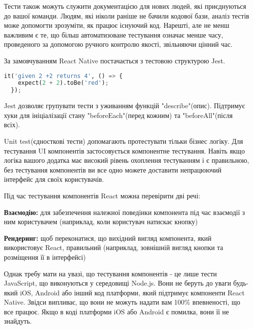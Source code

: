 Тести також можуть служити документацією для нових людей, які приєднуються до вашої команди.
Людям, які ніколи раніше не бачили кодової бази, аналіз тестів може допомогти зрозуміти, як працює існуючий код.
Нарешті, але не менш важливим є те, що більш автоматизоване тестування означає менше часу, проведеного за допомогою ручного контролю якості, звільняючи цінний час.

За замовчуванням React Native постачається з тестовою структурою Jest. \cite{jest_home_page}

\begin{lstlisting}[style=light, language=Python,label={lst:rn_jest_test},caption=Jest Unit Test]
  it('given 2 +2 returns 4', () => {
    expect(2 + 2).toBe('red');
  });
\end{lstlisting}

Jest дозволяє групувати тести з уживанням функцій "describe"(опис).
Підтримує хуки для ініціалізації стану "beforeEach"(перед кожним) та "beforeAll"(після всіх).

Unit test(єдносткові тести) допомагають протестувати тільки бізнес логіку.
Для тестування UI компонентів застосовується компонентне тестування.
Навіть якщо логіка вашого додатка має високий рівень охоплення тестуванням і є правильною,
без тестування компонентів ви все одно можете доставити непрацюючий інтерфейс для своїх користувачів.

Під час тестування компонентів React можна перевірити дві речі:

\begin{itemize}
    \begin{item}
        \textbf{Взаємодію:} для забезпечення належної поведінки компонента під час взаємодії з ним користувачем (наприклад, коли користувач натискає кнопку)
    \end{item}
    \begin{item}
        \textbf{Рендеринг:} щоб переконатися, що вихідний вигляд компонента, який використовує React, правильний (наприклад, зовнішній вигляд кнопки та розміщення її в інтерфейсі)
    \end{item}
\end{itemize}

Однак требу мати на увазі, що тестування компонентів - це лише тести JavaScript, що виконуються у середовищі Node.js.
Вони не беруть до уваги будь-який iOS, Android або інший код платформи, який підтримує компоненти React Native.
Звідси випливає, що вони не можуть надати вам 100\% впевненості, що все працює.
Якщо в коді платформи iOS або Android є помилка, вони її не знайдуть.

